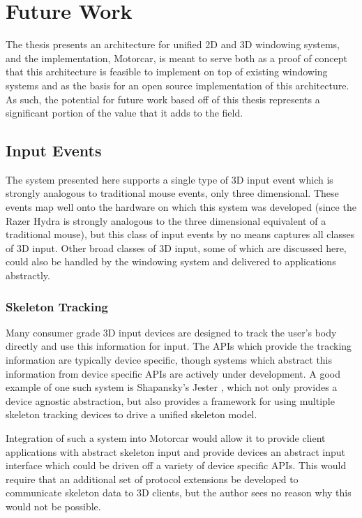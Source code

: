 \chapter{Future Work}
The thesis presents an architecture for unified 2D and 3D windowing systems, and the implementation, Motorcar, is meant to serve both as a proof of concept that this architecture is feasible to implement on top of existing windowing systems and as the basis for an open source implementation of this architecture. As such, the potential for future work based off of this thesis represents a significant portion of the value that it adds to the field. 

\section{Input Events}
The system presented here supports a single type of 3D input event which is strongly analogous to traditional mouse events, only three dimensional. These events map well onto the hardware on which this system was developed (since the Razer Hydra is strongly analogous to the three dimensional equivalent of a traditional mouse), but this class of input events by no means captures all classes of 3D input. Other broad classes of 3D input, some of which are discussed here, could also be handled by the windowing system and delivered to applications abstractly.

\subsection{Skeleton Tracking}
Many consumer grade 3D input devices are designed to track the user's body directly and use this information for input. The APIs which provide the tracking information are typically device specific, though systems which abstract this information from device specific APIs are actively under development. A good example of one such system is Shapansky's Jester \cite{jester}, which not only provides a device agnostic abstraction, but also provides a framework for using multiple skeleton tracking devices to drive a unified skeleton model. 

Integration of such a system into Motorcar would allow it to provide client applications with abstract skeleton input and provide devices an abstract input interface which could be driven off a variety of device specific APIs. This would require that an additional set of protocol extensions be developed to communicate skeleton data to 3D clients, but the author sees no reason why this would not be possible. 

